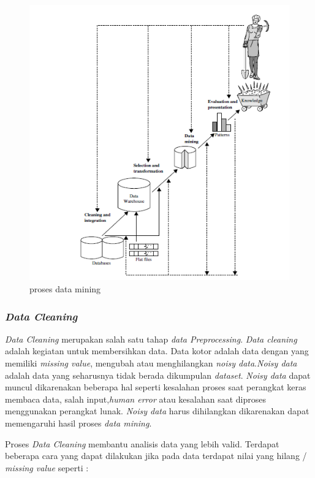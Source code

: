 \documentclass[a4paper,twoside]{article}
\begin{document}
\begin{enumerate}
\begin{figure}[h!]
	\centering  
	\includegraphics[scale=0.7]{dataminingprocess}   
	
	\label{fig:dataminingprocess} 	
	\caption{proses data mining}
\end{figure} 

\subsubsection{\textit{Data Cleaning}}
\textit{Data Cleaning} merupakan salah satu tahap \textit{data Preprocessing}. \textit{Data cleaning} adalah kegiatan untuk membersihkan data. Data kotor adalah data dengan yang memiliki \textit{missing value}, mengubah atau menghilangkan \textit{noisy data}.\textit{Noisy data} adalah data yang seharusnya tidak berada dikumpulan \textit{dataset}. \textit{Noisy data} dapat muncul dikarenakan beberapa hal seperti kesalahan proses saat perangkat keras membaca data, salah input,\textit{human error} atau kesalahan saat diproses menggunakan perangkat lunak. \textit{Noisy data} harus dihilangkan dikarenakan dapat memengaruhi hasil proses \textit{data mining}.

 Proses \textit{Data Cleaning} membantu analisis data yang lebih valid. Terdapat beberapa cara yang dapat dilakukan jika pada data terdapat nilai yang hilang / \textit{missing value} seperti :


\end{enumerate}
\end{document}
